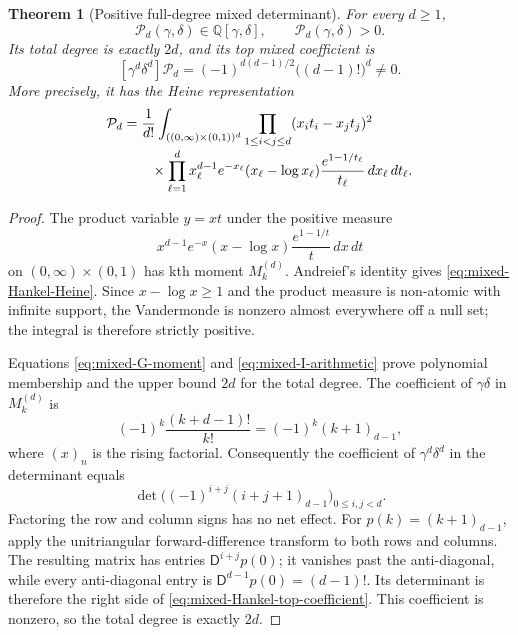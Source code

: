 \documentclass[11pt]{article}
\newtheorem{theorem}{Theorem}[section]
\theoremstyle{definition}
\theoremstyle{remark}
\begin{document}
\begin{theorem}[Positive full-degree mixed determinant]
\label{thm:positive-full-degree-mixed-determinant}
For every $d\geq1$,
\[
 \mathcal P_d(\gamma,\delta)\in\mathbb Q[\gamma,\delta],
 \qquad \mathcal P_d(\gamma,\delta)>0.
\]
Its total degree is exactly $2d$, and its top mixed coefficient is
\begin{equation}\label{eq:mixed-Hankel-top-coefficient}
 [\gamma^d\delta^d]\mathcal P_d
 =(-1)^{d(d-1)/2}\bigl((d-1)!\bigr)^d\ne0.
\end{equation}
More precisely, it has the Heine representation
\begin{align}
 \mathcal P_d
 &=\frac1{d!}
 \int_{((0,\infty)\times(0,1))^d}
 \prod_{1\leq i<j\leq d}(x_it_i-x_jt_j)^2
 \notag\\[-1mm]
 &\qquad\times
 \prod_{\ell=1}^d
 x_\ell^{d-1}e^{-x_\ell}(x_\ell-\log x_\ell)
 \frac{e^{1-1/t_\ell}}{t_\ell}
 \,dx_\ell\,dt_\ell.
 \label{eq:mixed-Hankel-Heine}
\end{align}
\end{theorem}

\begin{proof}
The product variable $y=xt$ under the positive measure
\[
 x^{d-1}e^{-x}(x-\log x)
 \frac{e^{1-1/t}}t\,dx\,dt
\]
on $(0,\infty)\times(0,1)$ has kth moment $M_k^{(d)}$.
Andreief's identity gives \eqref{eq:mixed-Hankel-Heine}.  Since
$x-\log x\geq1$ and the product measure is non-atomic with infinite
support, the Vandermonde is nonzero almost everywhere off a null set;
the integral is therefore strictly positive.

Equations \eqref{eq:mixed-G-moment} and
\eqref{eq:mixed-I-arithmetic} prove polynomial membership and the upper
bound $2d$ for the total degree.  The coefficient of $\gamma\delta$ in
$M_k^{(d)}$ is
\[
 (-1)^k\frac{(k+d-1)!}{k!}
 =(-1)^k(k+1)_{d-1},
\]
where $(x)_n$ is the rising factorial.  Consequently the coefficient of
$\gamma^d\delta^d$ in the determinant equals
\[
 \det\bigl((-1)^{i+j}(i+j+1)_{d-1}\bigr)_{0\leq i,j<d}.
\]
Factoring the row and column signs has no net effect.  For
$p(k)=(k+1)_{d-1}$, apply the unitriangular forward-difference transform
to both rows and columns.  The resulting matrix has entries
$\mathsf D^{i+j}p(0)$; it vanishes past the anti-diagonal, while every
anti-diagonal entry is
$\mathsf D^{d-1}p(0)=(d-1)!$.  Its determinant is therefore the right
side of \eqref{eq:mixed-Hankel-top-coefficient}.  This coefficient is
nonzero, so the total degree is exactly $2d$.
\end{proof}
\end{document}
